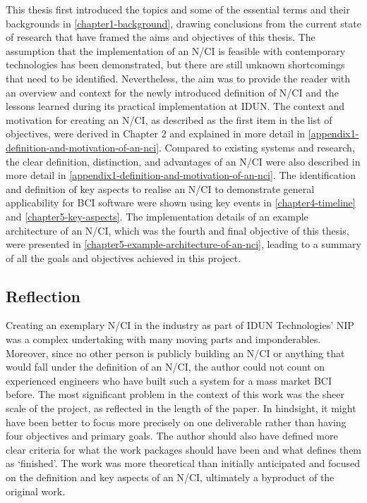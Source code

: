 This thesis first introduced the topics and some of the essential terms and their backgrounds in \autoref{chapter1-background}, drawing conclusions from the current state of research that have framed the aims and objectives of this thesis. The assumption that the implementation of an N/CI is feasible with contemporary technologies has been demonstrated, but there are still unknown shortcomings that need to be identified. Nevertheless, the aim was to provide the reader with an overview and context for the newly introduced definition of N/CI and the lessons learned during its practical implementation at IDUN. The context and motivation for creating an N/CI, as described as the first item in the list of objectives, were derived in Chapter 2 and explained in more detail in \autoref{appendix1-definition-and-motivation-of-an-nci}. Compared to existing systems and research, the clear definition, distinction, and advantages of an N/CI were also described in more detail in \autoref{appendix1-definition-and-motivation-of-an-nci}. The identification and definition of key aspects to realise an N/CI to demonstrate general applicability for BCI software were shown using key events in \autoref{chapter4-timeline} and \autoref{chapter5-key-aspects}. The implementation details of an example architecture of an N/CI, which was the fourth and final objective of this thesis, were presented in \autoref{chapter5-example-architecture-of-an-nci}, leading to a summary of all the goals and objectives achieved in this project.

\subsection{Reflection}
\label{chapter5-reflection}

Creating an exemplary N/CI in the industry as part of IDUN Technologies’ NIP was a complex undertaking with many moving parts and imponderables. Moreover, since no other person is publicly building an N/CI or anything that would fall under the definition of an N/CI, the author could not count on experienced engineers who have built such a system for a mass market BCI before. The most significant problem in the context of this work was the sheer scale of the project, as reflected in the length of the paper. In hindsight, it might have been better to focus more precisely on one deliverable rather than having four objectives and primary goals. The author should also have defined more clear criteria for what the work packages should have been and what defines them as ‘finished’. The work was more theoretical than initially anticipated and focused on the definition and key aspects of an N/CI, ultimately a byproduct of the original work.

